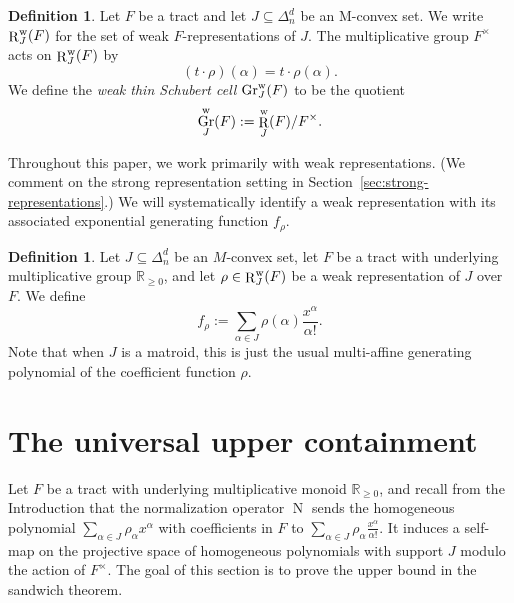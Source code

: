 \documentclass[12pt]{amsart}
\theoremstyle{definition}
\newtheorem{definition}[theorem]{Definition}
\newcommand{\1}{\mathbf{1}}
\DeclareMathOperator{\upN}{N}   %
\DeclareMathOperator{\upR}{R}   %
\DeclareMathOperator{\Gr}{Gr}
\newcommand\R{{\mathbb R}}
\newcommand\mb{\texorpdfstring{\textbf{Matt:} }{Matt: }}
\newcommand{\mk}[2][]{\todo[color=orange, #1]{\textbf{Mario}: #2}}
\begin{document}
\begin{definition}
Let $F$ be a tract and let $J\subseteq \Delta_n^d$ be an M-convex set. We write
$\upR_J^{\rm w}(F)$ for the set of weak $F$-representations of $J$. The multiplicative group $F^\times$ 
acts on $\upR_J^{\rm w}(F)$ by
\[
(t \cdot \rho)(\alpha) = t \cdot \rho(\alpha).
\]
We define the \emph{weak thin Schubert cell} $\Gr_J^{\rm w}(F)$ to be the quotient
\[
\Gr_J^{\rm w}(F):=\upR_J^{\rm w}(F)/F^\times .
\]
\end{definition}


Throughout this paper, we work primarily with weak representations. 
(We comment on the strong representation setting in Section~\ref{sec:strong-representations}.)
We will systematically identify a weak representation with its associated
exponential generating function $f_\rho$.

\begin{definition}
Let $J\subseteq \Delta_n^d$ be an $M$-convex set, let $F$ be a tract with underlying multiplicative group $\R_{\ge 0}$, and let
$\rho\in \upR_J^{\rm w}(F)$ be a weak representation of $J$ over $F$. We define
\[
f_\rho := \sum_{\alpha\in J} \rho(\alpha)\frac{x^\alpha}{\alpha!}.
\]
Note that when $J$ is a matroid, this is just the usual multi-affine generating polynomial of the
coefficient function $\rho$.
\end{definition}

\section{The universal upper containment}
\label{sec:universal-upper}

Let $F$ be a tract with underlying multiplicative monoid $\R_{\ge 0}$, and recall from the Introduction that the normalization operator $\upN$ sends the homogeneous polynomial
$\sum_{\alpha\in J}\rho_\alpha x^\alpha$ with coefficients in $F$
to $\sum_{\alpha\in J}\rho_\alpha \frac{x^\alpha}{\alpha!}$.
It induces a self-map on the projective space of homogeneous polynomials with support $J$ modulo the action of $F^\times$.
The goal of this section is to prove the upper bound in the sandwich theorem.
\end{document}
